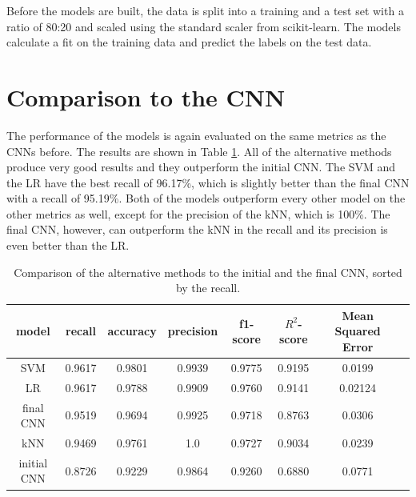 Before the models are built, the data is split into a training and a test set with a ratio of 80:20 and scaled using the standard scaler from scikit-learn.
The models calculate a fit on the training data and predict the labels on the test data.

\section{Comparison to the CNN}
\label{sec:comparison}

The performance of the models is again evaluated on the same metrics as the CNNs before.
The results are shown in Table \ref{tab:comparisonTable}.
All of the alternative methods produce very good results and they outperform the initial CNN.
The SVM and the LR have the best recall of 96.17\%, which is slightly better than the final CNN with a recall of 95.19\%.
Both of the models outperform every other model on the other metrics as well, except for the precision of the kNN, which is 100\%.
The final CNN, however, can outperform the kNN in the recall and its precision is even better than the LR.

\begin{table}[H]
    \centering
    \caption{Comparison of the alternative methods to the initial and the final CNN, sorted by the recall.}
    \label{tab:comparisonTable}
    \begin{tabular}{c | c c c c c c c}
        \toprule
        model & recall & accuracy & precision & f1-score & $R^2$-score & Mean Squared Error \\ 
        \midrule
        SVM & 0.9617 & 0.9801 & 0.9939 & 0.9775 & 0.9195 & 0.0199 \\
        LR & 0.9617 & 0.9788 & 0.9909 & 0.9760 & 0.9141 & 0.02124 \\
        final CNN & 0.9519 & 0.9694 & 0.9925 & 0.9718 & 0.8763 & 0.0306 \\ 
        kNN & 0.9469 & 0.9761 & 1.0 & 0.9727 & 0.9034 & 0.0239 \\
        initial CNN & 0.8726 & 0.9229 & 0.9864 & 0.9260 & 0.6880 & 0.0771 \\
        \bottomrule
    \end{tabular}
\end{table}



